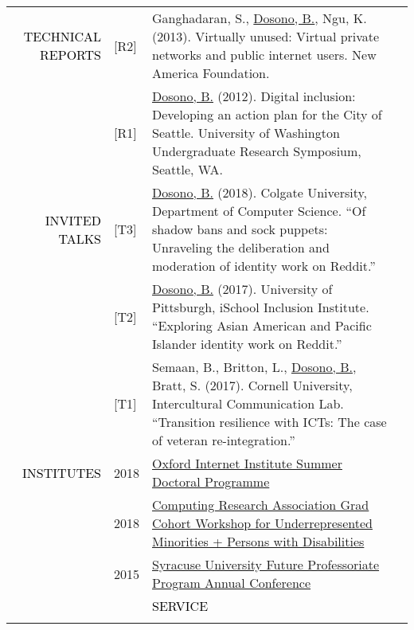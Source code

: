 \documentclass[12pt]{article}
\begin{document}
{{\begin{longtable}{Rp{1.0in}p{0.25in}p{4.75in}}
\textcolor{black}{\footnotesize{\uppercase{Technical Reports}}} & \footnotesize{[R2]} & Ganghadaran, S., \href{http://newamerica.net/publications/policy/virtually_unused}{{Dosono, B.}}, Ngu, K. (2013). Virtually unused: Virtual private networks and public internet users. New America Foundation. \\

& \footnotesize{[R1]} & \href{http://youtu.be/Xob0hWqZQgU}{{Dosono, B.}} (2012). Digital inclusion: Developing an action plan for the City of Seattle. University of Washington Undergraduate Research Symposium, Seattle, WA. \\

\textcolor{black}{\footnotesize{\uppercase{Invited Talks}}} & \footnotesize{[T3]} & \href{https://cs.colgate.edu/cs/events/151/}{{Dosono, B.}} (2018). Colgate University, Department of Computer Science. ``Of shadow bans and sock puppets: Unraveling the deliberation and moderation of identity work on Reddit.'' \\

& \footnotesize{[T2]} & \href{http://www.sis.pitt.edu/i3/i3-cohorts/2017/schedule.html}{{Dosono, B.}} (2017). University of Pittsburgh, iSchool Inclusion Institute. ``Exploring Asian American and Pacific Islander identity work on Reddit.'' \\

& \footnotesize{[T1]} & Semaan, B., Britton, L., \href{http://bit.ly/CornellTalk}{{Dosono, B.}}, Bratt, S. (2017). Cornell University, Intercultural Communication Lab. ``Transition resilience with ICTs: The case of veteran re-integration.'' \\

\textcolor{black}{\footnotesize{\uppercase{Institutes}}} & \footnotesize{2018} & \href{https://www.oii.ox.ac.uk/blog/oii-sdp-cultivating-charismatic-cohorts/}{{Oxford Internet Institute Summer Doctoral Programme}} \\

& \footnotesize{2018} & \href{https://cra.org/events/urmgradcohort/}{{Computing Research Association Grad Cohort Workshop for Underrepresented Minorities + Persons with Disabilities}} \\

& \footnotesize{2015} & \href{http://graduateschool.syr.edu/programs/future-professoriate-program/}{{Syracuse University Future Professoriate Program Annual Conference}} \bigskip \\

&&\par \Large \textcolor{black}{\uppercase{Service}}\\ \hhline{~~-}


\end{longtable}}}
\end{document}

